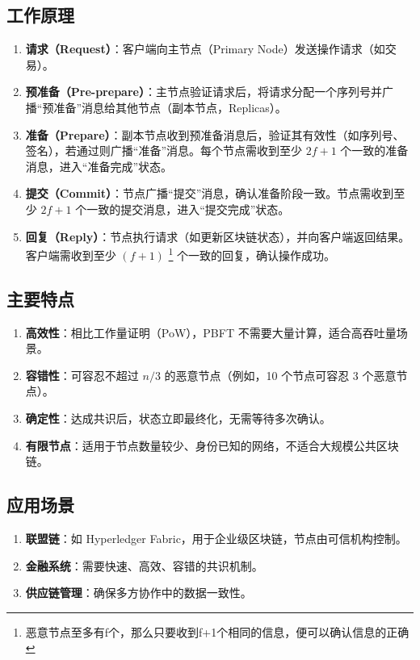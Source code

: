 \documentclass[12pt]{ctexart}
\begin{document}
\subsection{工作原理}
\begin{enumerate}
    \item \textbf{请求（Request）}：客户端向主节点（Primary Node）发送操作请求（如交易）。
    \item \textbf{预准备（Pre-prepare）}：主节点验证请求后，将请求分配一个序列号并广播“预准备”消息给其他节点（副本节点，Replicas）。
    \item \textbf{准备（Prepare）}：副本节点收到预准备消息后，验证其有效性（如序列号、签名），若通过则广播“准备”消息。每个节点需收到至少 \( 2f + 1 \) 个一致的准备消息，进入“准备完成”状态。
    \item \textbf{提交（Commit）}：节点广播“提交”消息，确认准备阶段一致。节点需收到至少 \( 2f + 1 \) 个一致的提交消息，进入“提交完成”状态。
    \item \textbf{回复（Reply）}：节点执行请求（如更新区块链状态），并向客户端返回结果。客户端需收到至少 \(( f + 1 )\) \footnote{恶意节点至多有f个，那么只要收到f+1个相同的信息，便可以确认信息的正确} 个一致的回复，确认操作成功。
\end{enumerate}

\subsection{主要特点}
\begin{enumerate}
    \item \textbf{高效性}：相比工作量证明（PoW），PBFT 不需要大量计算，适合高吞吐量场景。
    \item \textbf{容错性}：可容忍不超过 \( n/3 \) 的恶意节点（例如，10 个节点可容忍 3 个恶意节点）。
    \item \textbf{确定性}：达成共识后，状态立即最终化，无需等待多次确认。
    \item \textbf{有限节点}：适用于节点数量较少、身份已知的网络，不适合大规模公共区块链。
\end{enumerate}

\subsection{应用场景}
\begin{enumerate}
    \item \textbf{联盟链}：如 Hyperledger Fabric，用于企业级区块链，节点由可信机构控制。
    \item \textbf{金融系统}：需要快速、高效、容错的共识机制。
    \item \textbf{供应链管理}：确保多方协作中的数据一致性。
\end{enumerate}
\end{document}
